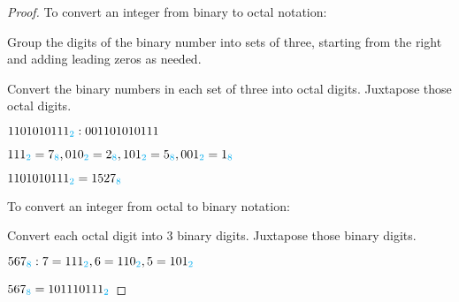\documentclass[14pt]{extarticle}
\newcommand{\base}[1]{{\color{cyan}#1}}
\begin{document}
\begin{proof}
    To convert an integer from binary to octal notation:

    Group the digits of the binary number into sets of three, starting from the right and adding leading zeros as needed.

    Convert the binary numbers in each set of three into octal digits. Juxtapose those octal digits.

    $1101010111_\base{2}: 001 101 010 111$

    $111_\base{2} = 7_\base{8}, 010_\base{2} = 2_\base{8}, 101_\base{2} = 5_\base{8}, 001_\base{2} = 1_\base{8}$

    $1101010111_\base{2} = 1527_\base{8}$

    To convert an integer from octal to binary notation:

    Convert each octal digit into 3 binary digits. Juxtapose those binary digits.

    $567_\base{8}:  7 = 111_\base{2}, 6 = 110_\base{2}, 5 = 101_\base{2}$

    $567_\base{8} = 101110111_\base{2}$
\end{proof}
\end{document}

